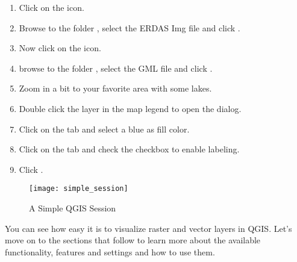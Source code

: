 
\begin{enumerate}
\item Click on the  icon.
\item Browse to the folder , select 
the ERDAS Img file  and click .
\item Now click on the  icon.
\item browse to the folder , select 
the GML file  and click .
\item Zoom in a bit to your favorite area with some lakes.
\item Double click the  layer in the map legend to open the 
 dialog.
\item Click on the  tab and select a blue as fill color.
\item Click on the  tab and check the  
checkbox to enable labeling.
\item Click .
\end{enumerate} 

\begin{figure}[ht]
   \begin{center}
   \caption{A Simple QGIS Session \nixcaption}\label{fig:simple_session}\smallskip
   \texttt{[image: simple\_session]}
\end{center}  
\end{figure}

You can see how easy it is to visualize raster and vector layers in 
QGIS. Let's move on to the sections that follow to learn more about the 
available functionality, features and settings and how to use them.
